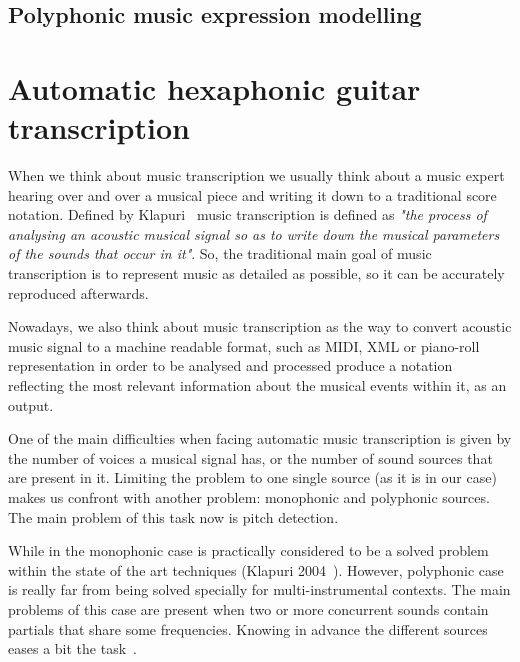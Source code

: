 \subsection{Polyphonic music expression modelling}
\label{sec:polymuexpmod}

\section{Automatic hexaphonic guitar transcription}
\label{sec:autohexaguit}
When we think about music transcription we usually think about a music expert hearing over and over a musical piece and writing it down to a traditional score notation. Defined by Klapuri~\cite{Klapuri2004} music transcription is defined as \textit{"the process of analysing an acoustic musical signal so as to write down the musical parameters of the sounds that occur in it"}. So, the traditional main goal of music transcription is to represent music as detailed as possible, so it can be accurately reproduced afterwards. 

Nowadays, we also think about music transcription as the way to convert acoustic music signal to a machine readable format, such as MIDI, XML or piano-roll representation in order to be analysed and processed produce a notation reflecting the most relevant information about the musical events within it, as an output. 	

One of the main difficulties when facing automatic music transcription is given by the number of voices a musical signal has, or the number of sound sources that are present in it. Limiting the problem to one single source (as it is in our case) makes us confront with another problem: monophonic and polyphonic sources. The main problem of this task now is pitch detection. 

While in the monophonic case is practically considered to be a solved problem within the state of the art techniques (Klapuri 2004~\cite{Klapuri2004}). However, polyphonic case is really far from being solved specially for multi-instrumental contexts. The main problems of this case are present when two or more concurrent sounds contain partials that share some frequencies. Knowing in advance the different sources eases a bit the task~\cite{argenti2011}. 





























\cleardoublepage